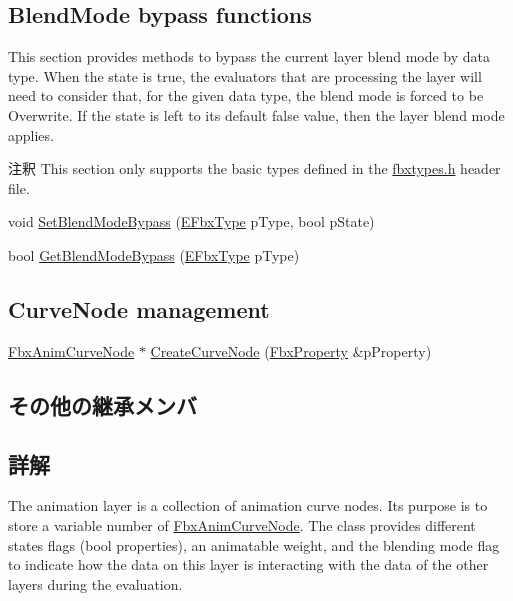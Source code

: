 \subsection*{Blend\+Mode bypass functions}
\label{_amgrp69dcbe1ac0f20ac1568a8b5ca4119588}%
This section provides methods to bypass the current layer blend mode by data type. When the state is {\ttfamily true}, the evaluators that are processing the layer will need to consider that, for the given data type, the blend mode is forced to be Overwrite. If the state is left to its default {\ttfamily false} value, then the layer blend mode applies. \begin{DoxyRemark}{注釈}
This section only supports the basic types defined in the \hyperlink{fbxtypes_8h}{fbxtypes.\+h} header file. 
\end{DoxyRemark}
\begin{DoxyCompactItemize}
\item 
void \hyperlink{class_fbx_anim_layer_a8be5d3511971847c8f8d88c0a9fe2158}{Set\+Blend\+Mode\+Bypass} (\hyperlink{fbxpropertytypes_8h_a73913a5ddfb20e57c6f25e9e6784bd92}{E\+Fbx\+Type} p\+Type, bool p\+State)
\item 
bool \hyperlink{class_fbx_anim_layer_a3f16ece7c4506b8d72c2b77db5e81586}{Get\+Blend\+Mode\+Bypass} (\hyperlink{fbxpropertytypes_8h_a73913a5ddfb20e57c6f25e9e6784bd92}{E\+Fbx\+Type} p\+Type)
\end{DoxyCompactItemize}
\subsection*{Curve\+Node management}
\begin{DoxyCompactItemize}
\item 
\hyperlink{class_fbx_anim_curve_node}{Fbx\+Anim\+Curve\+Node} $\ast$ \hyperlink{class_fbx_anim_layer_a634a9dd8c4a0a7457a15d50f9643d4e0}{Create\+Curve\+Node} (\hyperlink{class_fbx_property}{Fbx\+Property} \&p\+Property)
\end{DoxyCompactItemize}
\subsection*{その他の継承メンバ}


\subsection{詳解}
The animation layer is a collection of animation curve nodes. Its purpose is to store a variable number of \hyperlink{class_fbx_anim_curve_node}{Fbx\+Anim\+Curve\+Node}. The class provides different states flags (bool properties), an animatable weight, and the blending mode flag to indicate how the data on this layer is interacting with the data of the other layers during the evaluation. 

